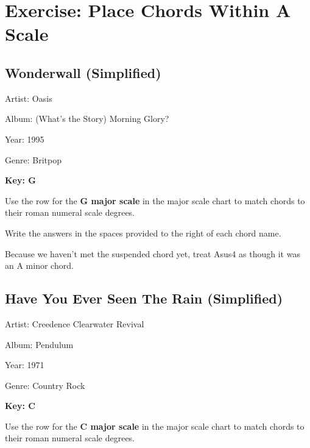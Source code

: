 \documentclass{article}
\begin{document}
\clearpage

\section{Exercise: Place Chords Within A Scale}

\subsection{Wonderwall (Simplified)}


Artist: Oasis

Album: (What's the Story) Morning Glory?

Year: 1995

Genre: Britpop

\textbf{Key: G}

\def\numfrets{5}
\bigskip

Use the row for the \textbf{G major scale} in the major scale chart to match chords to their roman numeral scale degrees.

\bigskip

Write the answers in the spaces provided to the right of each chord name.

\bigskip

Because we haven't met the suspended chord yet, treat Asus4 as though it was an A minor chord.


\subsection{Have You Ever Seen The Rain (Simplified)}

Artist: Creedence Clearwater Revival

Album: Pendulum

Year: 1971

Genre: Country Rock

\textbf{Key: C}

\def\numfrets{5}
\bigskip

Use the row for the \textbf{C major scale} in the major scale chart to match chords to their roman numeral scale degrees.
\end{document}
